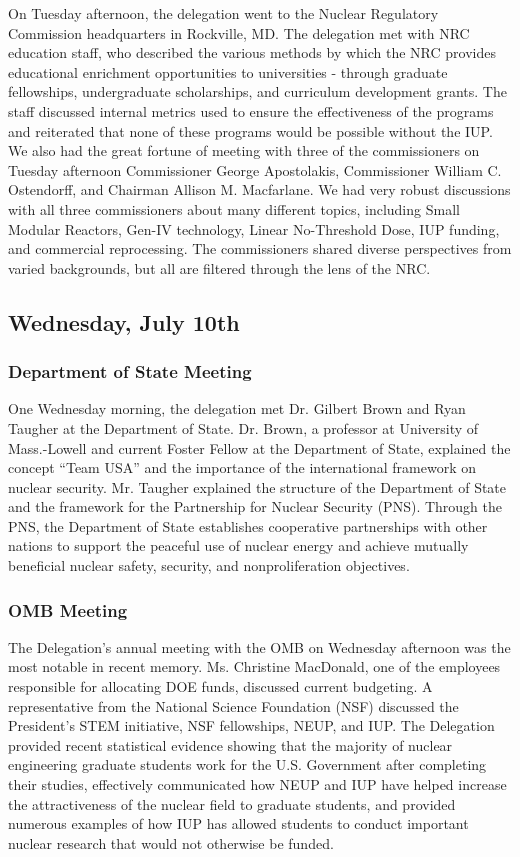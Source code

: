 On Tuesday afternoon, the delegation went to the Nuclear Regulatory Commission
headquarters in Rockville, MD. The delegation met with NRC education staff, who
described the various methods by which the NRC provides educational enrichment
opportunities to universities - through graduate fellowships, undergraduate
scholarships, and curriculum development grants. The staff discussed internal
metrics used to ensure the effectiveness of the programs and reiterated that
none of these programs would be possible without the IUP. We also had the great
fortune of meeting with three of the commissioners on Tuesday afternoon
Commissioner George Apostolakis, Commissioner William C. Ostendorff, and
Chairman Allison M. Macfarlane. We had very robust discussions with all three
commissioners about many different topics, including Small Modular Reactors,
Gen-IV technology, Linear No-Threshold Dose, IUP funding, and commercial
reprocessing. The commissioners shared diverse perspectives from varied
backgrounds, but all are filtered through the lens of the NRC.

\subsection*{Wednesday, July 10th}

\subsubsection*{Department of State Meeting}

One Wednesday morning, the delegation met Dr. Gilbert Brown and Ryan Taugher at
the Department of State. Dr. Brown, a professor at University of Mass.-Lowell
and current Foster Fellow at the Department of State, explained the concept
``Team USA'' and the importance of the international framework on nuclear
security. Mr. Taugher explained the structure of the Department of State and the
framework for the Partnership for Nuclear Security (PNS). Through the PNS, the
Department of State establishes cooperative partnerships with other nations to
support the peaceful use of nuclear energy and achieve mutually beneficial
nuclear safety, security, and nonproliferation objectives.
 
\subsubsection*{OMB Meeting}

The Delegation’s annual meeting with the OMB on Wednesday afternoon was the most
notable in recent memory. Ms. Christine MacDonald, one of the employees
responsible for allocating DOE funds, discussed current budgeting. A
representative from the National Science Foundation (NSF) discussed the
President’s STEM initiative, NSF fellowships, NEUP, and IUP. The Delegation
provided recent statistical evidence showing that the majority of nuclear
engineering graduate students work for the U.S. Government after completing
their studies, effectively communicated how NEUP and IUP have helped increase
the attractiveness of the nuclear field to graduate students, and provided
numerous examples of how IUP has allowed students to conduct important nuclear
research that would not otherwise be funded.
 
